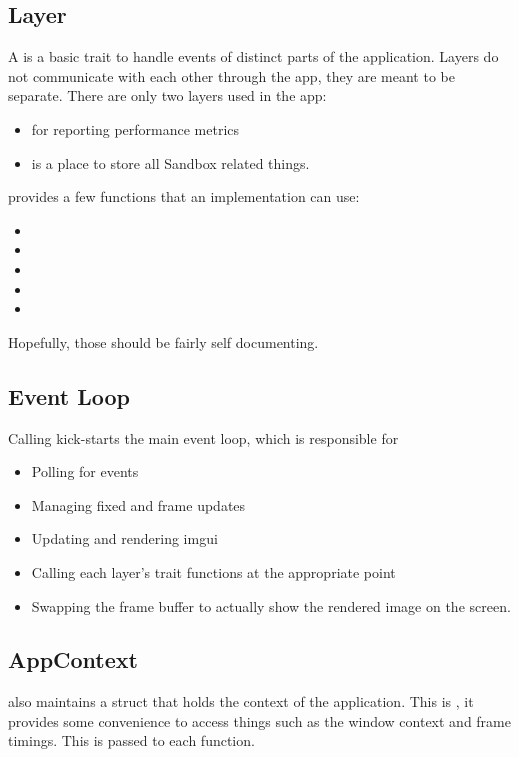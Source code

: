 \begin{multicols}{2}

  \subsection{Layer}
  A  is a basic trait to handle events of distinct parts of the application.
  Layers do not communicate with each other through the app, they are meant to be separate.
  There are only two layers used in the app:
  \begin{itemize}
    \item {} for reporting performance metrics
    \item {} is a place to store all Sandbox related things.
  \end{itemize}
   provides a few functions that an implementation can use:
  \begin{itemize}
    \item {}
    \item {}
    \item {}
    \item {}
    \item {}
  \end{itemize}

  Hopefully, those should be fairly self documenting.

  \subsection{Event Loop}
  Calling  kick-starts the main event loop, which is responsible for
  \begin{itemize}
    \item Polling for events
    \item Managing fixed and frame updates
    \item Updating and rendering imgui
    \item Calling each layer's  trait functions at the appropriate point
    \item Swapping the frame buffer to actually show the rendered image on the screen.
  \end{itemize}

  \subsection{AppContext}
   also maintains a struct that holds the context of the application.
  This is , it provides some convenience to access things such as the window context and frame timings.
  This is passed to each  function.


\end{multicols}
